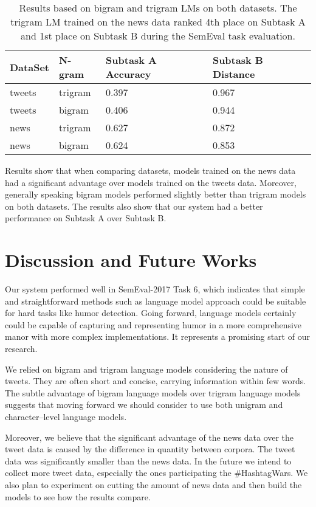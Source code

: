 \documentclass[11pt,a4paper]{article}
\begin{document}
\begin{table}[h]
\begin{center}
\begin{tabular}{ |p{1.2cm}|p{1.2cm}|p{1.7cm}|p{1.7cm}|}
\hline
DataSet & N-gram & Subtask A Accuracy & Subtask B Distance \\
\hline
tweets & trigram & 0.397 & 0.967 \\
\hline
tweets & bigram & 0.406 & 0.944 \\
\hline
news & trigram & 0.627 & 0.872 \\
\hline
news & bigram & 0.624 & 0.853 \\
\hline
\end{tabular}
\caption{Results based on bigram and trigram LMs on both datasets. The trigram LM trained on the news data ranked 4th place on Subtask A and 1st place on Subtask B during the SemEval task evaluation.}
\end{center}
\end{table}
Results show that when comparing datasets, models trained on the news data had a significant advantage over models trained on the tweets data. Moreover, generally speaking bigram models performed slightly better than trigram models on both datasets. The results also show that our system had a better performance on Subtask A over Subtask B.

\section{Discussion and Future Works}

Our system performed well in SemEval-2017 Task 6, which indicates that simple and straightforward methods such as language model approach could be suitable for hard tasks like humor detection. Going forward, language models certainly could be capable of capturing and representing humor in a more comprehensive manor with more complex implementations. It represents a promising start of our research.

We relied on bigram and trigram language models considering the nature of tweets. They are often short and concise, carrying information within few words. The subtle advantage of bigram language models over trigram language models suggests that moving forward we should consider to use both unigram and character--level language models. 

Moreover, we believe that the significant advantage of the news data over the tweet data is caused by the difference in quantity between corpora. The tweet data was significantly smaller than the news data. In the future we intend to collect more tweet data, especially the ones participating the \#HashtagWars. We also plan to experiment on cutting the amount of news data and then build the models to see how the results compare.
\end{document}
